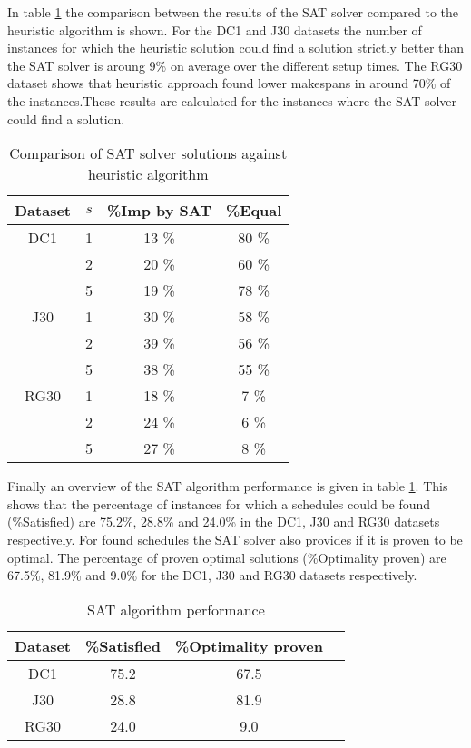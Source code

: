 In table \ref{table:table5} the comparison between the results of the SAT solver compared to the heuristic algorithm is shown. For the DC1 and J30 datasets the number of instances for which the heuristic solution could find a solution strictly better than the SAT solver is aroung 9\% on average over the different setup times. The RG30 dataset shows that heuristic approach found lower makespans in around 70\% of the instances.These results are calculated for the instances where the SAT solver could find a solution.

\begin{table}
	\begin{center}
		\caption{Comparison of SAT solver solutions against heuristic algorithm}
		\label{table:table5}
		\begin{tabular}{ c | c c c }
			Dataset & \(s\) & \%Imp by SAT & \%Equal \\
			\hline
			DC1 & 1 & 13 \% & 80 \% \\ 
			  	& 2 & 20 \% & 60 \%\\  
			  	& 5 & 19 \% & 78 \%\\ 
			J30 & 1 & 30 \% & 58 \%\\ 
			  	& 2 & 39 \% & 56 \%\\  
			  	& 5 & 38 \% & 55 \%\\ 
			RG30 & 1 & 18 \% & 7 \%\\ 
			 	 & 2 & 24 \% & 6 \%\\  
			 	 & 5 & 27 \% & 8 \%
		\end{tabular}
	\end{center}
\end{table}

Finally an overview of the SAT algorithm performance is given in table \ref{table:table5}. This shows that the percentage of instances for which a schedules could be found (\%Satisfied) are 75.2\%, 28.8\% and 24.0\% in the DC1, J30 and RG30 datasets respectively. For found schedules the SAT solver also provides if it is proven to be optimal. The percentage of proven optimal solutions (\%Optimality proven) are 67.5\%, 81.9\% and 9.0\% for the DC1, J30 and RG30 datasets respectively.

\begin{table}
	\begin{center}
		\caption{SAT algorithm performance}
		\label{table:table6}
		\begin{tabular}{ c | c c c }
			Dataset & \%Satisfied & \%Optimality proven \\
			\hline
			DC1 & 75.2 & 67.5 \\
			J30 & 28.8 & 81.9 \\ 
			RG30 & 24.0 & 9.0
		\end{tabular}
	\end{center}
\end{table}



